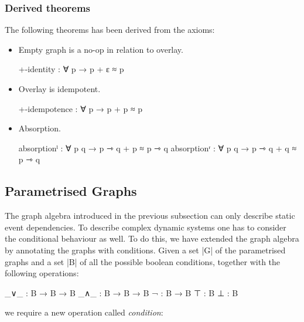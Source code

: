 \subsubsection{Derived theorems}


The following theorems has been derived from the axioms:

\begin{itemize}
\item{Empty graph is a no-op in relation to overlay.
\begin{code}
  +-identity : ∀ p → p + ε ≈ p
\end{code}}
\item{Overlay is idempotent.
\begin{code}
  +-idempotence : ∀ p → p + p ≈ p
\end{code}}
\item{Absorption.
\begin{code}
  absorptionˡ : ∀ p q → p ⇾ q + p ≈ p ⇾ q
  absorptionʳ : ∀ p q → p ⇾ q + q ≈ p ⇾ q
\end{code}}
\end{itemize}

\subsection{Parametrised Graphs}


The graph algebra introduced in the previous subsection can only describe static event dependencies.
To describe complex dynamic systems one has to consider the conditional behaviour as well.
To do this, we have extended the graph algebra by annotating the graphs with conditions.
Given a set |G| of the parametrised graphs and a set |B| of all the possible boolean conditions, together with the following operations:

\begin{code}
  _∨_ : B → B → B
  _∧_ : B → B → B
  ¬ : B → B
  ⊤ : B
  ⊥ : B
\end{code}

we require a new operation called \emph{condition}:



